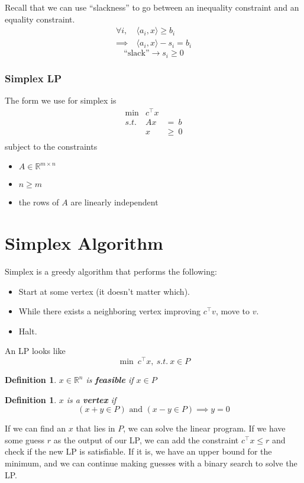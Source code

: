 \documentclass[11pt]{article}
\newcommand{\R}{\mathbb{R}}
\newtheorem{definition}[theorem]{Definition}
\begin{document}
Recall that we can use ``slackness'' to go between an inequality constraint
and an equality constraint.
\begin{align*}
\forall i,~& \langle a_i,x \rangle \geq b_i \\
  \implies & \langle a_i,x \rangle -s_i = b_i
\end{align*}
\[\mbox{``slack''} \rightarrow s_i \geq 0\]

\subsubsection{Simplex LP}

The form we use for simplex is
\begin{eqnarray*}
\min & c^\top x  \\
s.t. & Ax & =~b \\
 & x & \geq~0  \\
\end{eqnarray*}
subject to the constraints
\begin{itemize}
\item $A \in \R^{m \times n}$
\item $n \geq m$
\item the rows of $A$ are linearly independent
\end{itemize}

\section{Simplex Algorithm}

Simplex is a greedy algorithm that performs the following:
\begin{itemize}
\item Start at some vertex (it doesn't matter which).
\item While there exists a neighboring vertex improving $c^\top v$, move to $v$.
\item Halt.
\end{itemize}

An LP looks like \[\min~c^\top x,~s.t.~x\in P\]
\begin{definition}
  $x\in \R^n$ is \textbf{feasible} if $x \in P$
\end{definition}
\begin{definition}
  $x$ is a \textbf{vertex} if
  \[(x+y \in P) \text{ and } (x-y\in P) \implies y = 0\]
\end{definition}

If we can find an $x$ that lies in $P$, we can solve the linear program.
If we have some guess $r$ as the output of our LP,
we can add the constraint $c^\top x \leq r$ and check if the new LP is
satisfiable. If it is, we have an upper bound for the minimum, and we
can continue making guesses with a binary search to solve the LP.
\end{document}
